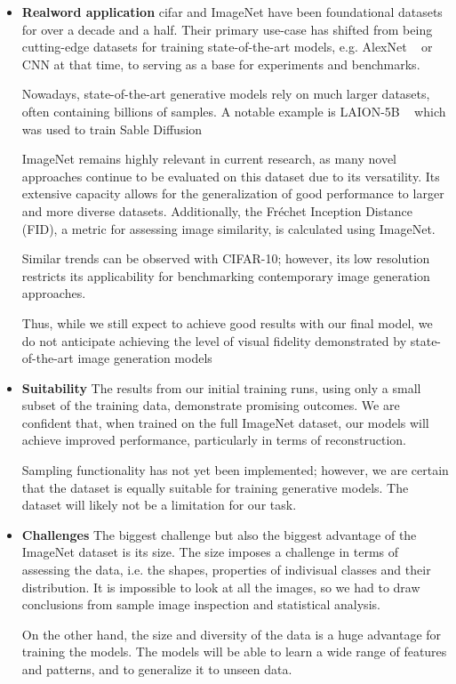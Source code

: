 \begin{itemize}
    \item \textbf{Realword application} \ac{cifar} and ImageNet have been foundational datasets for over a decade and a half.
    Their primary use-case has shifted from being cutting-edge datasets for training state-of-the-art models, e.g. AlexNet ~\cite{AlexNet} or CNN at that time,
    to serving as a base for experiments and benchmarks.

    Nowadays, state-of-the-art generative models rely on much larger datasets, often containing billions of samples. A notable example is LAION-5B ~\cite{laion5b} which was used to train Sable Diffusion ~\cite{stable_diff}

    ImageNet remains highly relevant in current research, as many novel approaches continue to be evaluated on this dataset due to its versatility. Its extensive capacity allows for the generalization of good performance to larger and more diverse datasets. Additionally, the Fréchet Inception Distance (FID), a metric for assessing image similarity, is calculated using ImageNet.

    Similar trends can be observed with CIFAR-10; however, its low resolution restricts its applicability for benchmarking contemporary image generation approaches.

    Thus, while we still expect to achieve good results with our final model, we do not anticipate achieving the level of visual fidelity demonstrated by state-of-the-art image generation models

    \item \textbf{Suitability} The results from our initial training runs, using only a small subset of the training data, demonstrate promising outcomes. We are confident that, when trained on the full ImageNet dataset, our models will achieve improved performance, particularly in terms of reconstruction.

    Sampling functionality has not yet been implemented; however, we are certain that the dataset is equally suitable for training generative models. The dataset will likely not be a limitation for our task.

    \item \textbf{Challenges} The biggest challenge but also the biggest advantage of the ImageNet dataset is its size. The size imposes a challenge in terms of assessing the data, i.e. the shapes, properties of indivisual classes and their distribution. It is impossible to look at all the images, so we had to draw conclusions from sample image inspection and statistical analysis.

    On the other hand, the size and diversity of the data is a huge advantage for training the models. The models will be able to learn a wide range of features and patterns, and to generalize it to unseen data.
\end{itemize}

